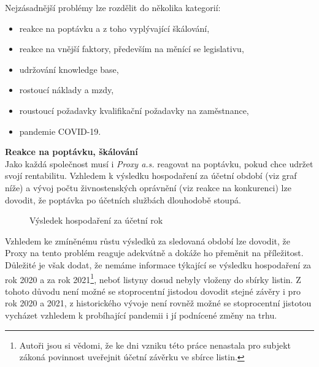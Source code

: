 Nejzásadnější problémy lze rozdělit do několika kategorií:\\

\begin{itemize}
	\item reakce na poptávku a z toho vyplývající škálování,
	\item reakce na vnější faktory, především na měnící se legislativu,
	\item udržování knowledge base,
	\item rostoucí náklady a mzdy,
	\item roustoucí požadavky kvalifikační požadavky na zaměstnance,
	\item pandemie COVID-19.
\end{itemize}

\vspace*{5mm}

\newpage

\textbf{Reakce na poptávku, škálování}\\

Jako každá společnost musí i \textit{Proxy a.s.} reagovat na poptávku, pokud chce udržet svojí rentabilitu. Vzhledem k výsledku hospodaření za účetní období (viz graf níže) a vývoj počtu živnostenských oprávnění (viz reakce na konkurenci) lze dovodit, že poptávka po účetních službách dlouhodobě stoupá.

\begin{figure}[!htbp]
	\caption[Výsledek hospodaření za účetní rok]{Výsledek hospodaření za účetní rok}
	\label{fig:vhzur}
\end{figure}

Vzhledem ke zmíněnému růstu výsledků za sledovaná období lze dovodit, že Proxy na tento problém reaguje adekvátně a dokáže ho přeměnit na příležitost.\\

Důležité je však dodat, že nemáme informace týkající se výsledku hospodaření za rok 2020 a za rok 2021\footnote{Autoři jsou si vědomi, že ke dni vzniku této práce nenastala pro subjekt zákoná povinnost uveřejnit účetní závěrku ve sbírce listin.}, neboť listyny dosud nebyly vloženy do sbírky listin. Z tohoto důvodu není možné se stoprocentní jistodou dovodit stejné závěry i pro rok 2020 a 2021, z historického vývoje není rovněž možné se stoprocentní jistotou vycházet vzhledem k probíhající pandemii i jí podnícené změny na trhu.\\

